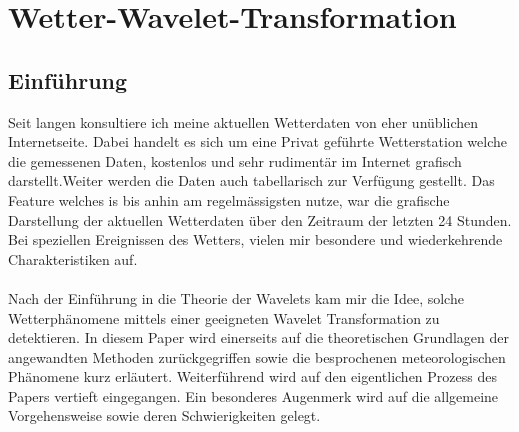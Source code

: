 %
%
%
\chapter{Wetter-Wavelet-Transformation\label{chapter:wwt}}
\begin{refsection}




\lstset{style=mystyle}


\section{Einführung}


Seit langen konsultiere ich meine aktuellen Wetterdaten von eher unüblichen Internetseite.
Dabei handelt es sich um eine Privat geführte Wetterstation welche die gemessenen Daten, kostenlos und sehr rudimentär im Internet grafisch darstellt.Weiter werden die Daten auch tabellarisch zur Verfügung gestellt.
Das Feature welches is bis anhin am regelmässigsten nutze, war die grafische Darstellung der aktuellen Wetterdaten über den Zeitraum der letzten 24 Stunden.
Bei speziellen Ereignissen des Wetters, vielen mir besondere und wiederkehrende Charakteristiken auf.
\\
\\
Nach der Einführung in die Theorie der Wavelets kam mir die Idee, solche Wetterphänomene mittels einer geeigneten Wavelet Transformation zu detektieren.
In diesem Paper wird einerseits auf die theoretischen Grundlagen der angewandten Methoden zurückgegriffen sowie die besprochenen meteorologischen Phänomene kurz erläutert. 
Weiterführend wird auf den eigentlichen Prozess des Papers vertieft eingegangen. Ein besonderes Augenmerk wird auf die allgemeine Vorgehensweise sowie deren Schwierigkeiten gelegt.
\\





\end{refsection}
